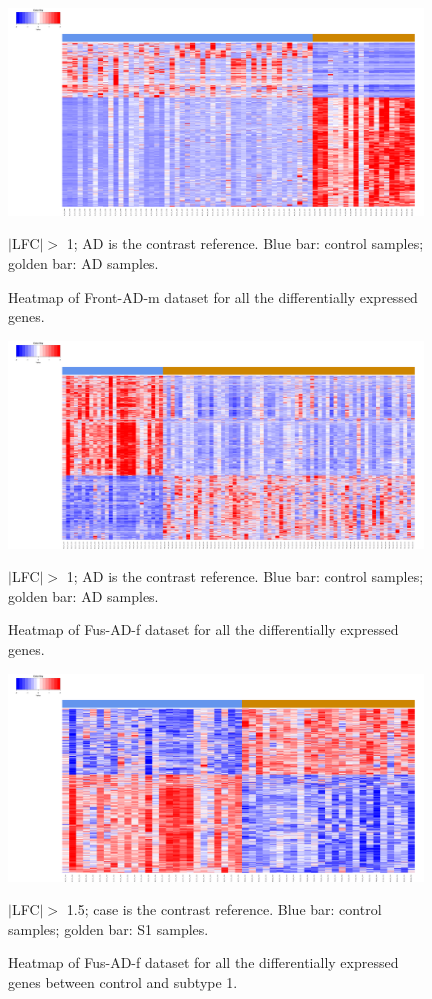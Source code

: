 \begin{figure}[!ht]
    \centerline{\includegraphics[width = 11cm]{Figures/DE heatmap/CTLvsAD-Front-m_all.png}}
\caption{Heatmap of Front-AD-m dataset for all the differentially expressed genes.}
\label{DE-front-ad-m}
\footnotesize $|$LFC$| >$ 1; AD is the contrast reference. Blue bar: control samples; golden bar: AD samples.
\end{figure}


\begin{figure}[!ht]
    \centerline{\includegraphics[width = 11cm]{Figures/DE heatmap/CTLvsAD-FUS-f_all.png}}
\caption{Heatmap of Fus-AD-f dataset for all the differentially expressed genes.}
\label{DE-fus-ad-f}
\footnotesize $|$LFC$| >$ 1; AD is the contrast reference. Blue bar: control samples; golden bar: AD samples.
\end{figure}

\begin{figure}[!ht]
    \centerline{\includegraphics[width = 11cm]{Figures/DE heatmap/CTLvs1_AD-FUS-f_all.png}}
\caption{Heatmap of Fus-AD-f dataset for all the differentially expressed genes between control and subtype 1.}
\footnotesize $|$LFC$| >$ 1.5; case is the contrast reference. Blue bar: control samples; golden bar: S1 samples.
\end{figure}

